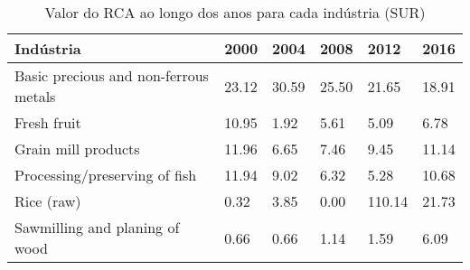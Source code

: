 \begin{table}
\centering
\caption{Valor do RCA ao longo dos anos para cada indústria (SUR)}
\begin{tabular}{p{6cm}p{1.5cm}p{1.5cm}p{1.5cm}p{1.5cm}p{1.5cm}}
\toprule
                            Indústria &  2000 &  2004 &  2008 &   2012 &  2016 \\
\midrule
Basic precious and non-ferrous metals & 23.12 & 30.59 & 25.50 &  21.65 & 18.91 \\
                          Fresh fruit & 10.95 &  1.92 &  5.61 &   5.09 &  6.78 \\
                  Grain mill products & 11.96 &  6.65 &  7.46 &   9.45 & 11.14 \\
        Processing/preserving of fish & 11.94 &  9.02 &  6.32 &   5.28 & 10.68 \\
                           Rice (raw) &  0.32 &  3.85 &  0.00 & 110.14 & 21.73 \\
       Sawmilling and planing of wood &  0.66 &  0.66 &  1.14 &   1.59 &  6.09 \\
\bottomrule
\end{tabular}
\end{table}
